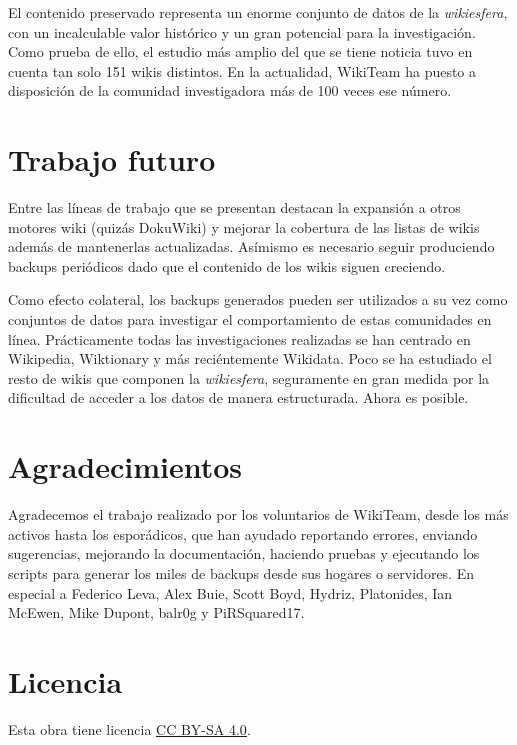 \documentclass[14pt,twocolumn]{article}
\begin{document}
El contenido preservado representa un enorme conjunto de datos de la \textit{wikiesfera}, con un incalculable valor histórico y un gran potencial para la investigación. Como prueba de ello, el estudio más amplio del que se tiene noticia tuvo en cuenta tan solo 151 wikis distintos.\cite{stuckman2009} En la actualidad, WikiTeam ha puesto a disposición de la comunidad investigadora más de 100 veces ese número.

\section{Trabajo futuro}

Entre las líneas de trabajo que se presentan destacan la expansión a otros motores wiki (quizás DokuWiki) y mejorar la cobertura de las listas de wikis además de mantenerlas actualizadas. Asímismo es necesario seguir produciendo backups periódicos dado que el contenido de los wikis siguen creciendo.

Como efecto colateral, los backups generados pueden ser utilizados a su vez como conjuntos de datos para investigar el comportamiento de estas comunidades en línea. Prácticamente todas las investigaciones realizadas se han centrado en Wikipedia, Wiktionary y más reciéntemente Wikidata. Poco se ha estudiado el resto de wikis que componen la \textit{wikiesfera}, seguramente en gran medida por la dificultad de acceder a los datos de manera estructurada. Ahora es posible.

\section*{Agradecimientos}

Agradecemos el trabajo realizado por los voluntarios de WikiTeam, desde los más activos hasta los esporádicos, que han ayudado reportando errores, enviando sugerencias, mejorando la documentación, haciendo pruebas y ejecutando los scripts para generar los miles de backups desde sus hogares o servidores. En especial a Federico Leva, Alex Buie, Scott Boyd, Hydriz, Platonides, Ian McEwen, Mike Dupont, balr0g y PiRSquared17.

\section*{Licencia}
Esta obra tiene licencia \href{http://creativecommons.org/licenses/by-sa/4.0/}{CC BY-SA 4.0}.



\end{document}
